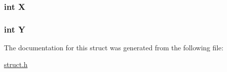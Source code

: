 \subsubsection[{\texorpdfstring{X}{X}}]{\setlength{\rightskip}{0pt plus 5cm}int X}\hypertarget{struct___player_a80c0944640e62d3ed6c5419c1bcc0c88}{}\label{struct___player_a80c0944640e62d3ed6c5419c1bcc0c88}
\subsubsection[{\texorpdfstring{Y}{Y}}]{\setlength{\rightskip}{0pt plus 5cm}int Y}\hypertarget{struct___player_aa482c4cc86a24474e4fb19b5b5978778}{}\label{struct___player_aa482c4cc86a24474e4fb19b5b5978778}


The documentation for this struct was generated from the following file\+:\begin{DoxyCompactItemize}
\item 
\hyperlink{struct_8h}{struct.\+h}\end{DoxyCompactItemize}
